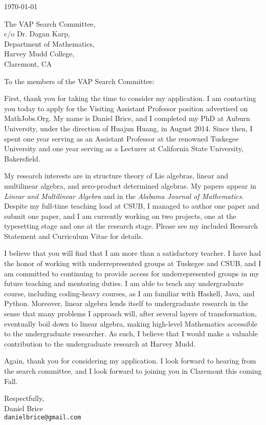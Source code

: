 \documentclass[11pt]{article}
\begin{document}
\makeletterhead

\vfill

\today

\vfill

The VAP Search Committee,\\
c/o Dr. Dagan Karp,\\
Department of Mathematics,\\
Harvey Mudd College,\\
Claremont, CA

\vfill

To the members of the VAP Search Committee:

First, thank you for taking the time to consider my application. I am
contacting you today to apply for the Visiting Assistant Professor
position advertised on MathJobs.Org. My name is Daniel Brice, and I
completed my PhD at Auburn University, under the direction of Huajun
Huang, in August 2014. Since then, I spent one year serving as an
Assistant Professor at the renowned Tuskegee University and one year
serving as a Lecturer at California State University, Bakersfield.

My research interests are in structure theory of Lie algebras, linear
and multilinear algebra, and zero-product determined algebras. My papers
appear in \emph{Linear and Multilinear Algebra} and in the \emph{Alabama
Journal of Mathematics}. Despite my full-time teaching load at CSUB, I
managed to author one paper and submit one paper, and I am currently
working on two projects, one at the typesetting stage and one at the
research stage. Please see my included Research Statement and Curriculum
Vitae for details.

I believe that you will find that I am more than a satisfactory teacher.
I have had the honor of working with underrepresented groups at Tuskegee
and CSUB, and I am committed to continuing to provide access for
underrepresented groups in my future teaching and mentoring duties.
I am able to teach any undergraduate course, including coding-heavy
courses, as I am familiar with Haskell, Java, and Python. Moreover,
linear algebra lends itself to undergraduate research in the sense that
many problems I approach will, after several layers of transformation,
eventually boil down to linear algebra, making high-level Mathematics
accessible to the undergraduate researcher. As such, I believe that I
would make a valuable contribution to the undergraduate research at
Harvey Mudd.

Again, thank you for considering my application. I look forward to
hearing from the search committee, and I look forward to joining you
in Claremont this coming Fall.

\vfill

Respectfully,\\

Daniel Brice\\
\texttt{danielbrice@gmail.com}

\label{page:last}
\end{document}
